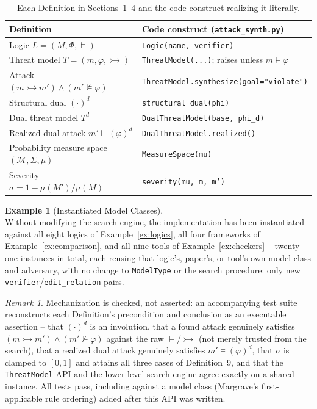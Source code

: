 \documentclass[11pt]{amsart}
\theoremstyle{definition}
\newtheorem{example}{Example}
\theoremstyle{remark}
\newtheorem*{remark}{Remark}
\newcommand{\nsat}{\not\models}
\newcommand{\adv}{\rightarrowtail}   %
\newcommand{\M}{\mathcal{M}}
\begin{document}
\begin{table}[h]
\centering
\small
\renewcommand{\arraystretch}{1.3}
\begin{tabular}{L{4.2cm} L{4.2cm}}
\toprule
\textbf{Definition} & \textbf{Code construct (\texttt{attack\_synth.py})} \\
\midrule
Logic $L = (M, \Phi, \models)$ & \texttt{Logic(name, verifier)} \\
Threat model $T = (m, \varphi, \adv)$ & \texttt{ThreatModel(...)}; raises unless $m \models \varphi$ \\
Attack $(m \adv m') \wedge (m' \nsat \varphi)$ & \texttt{ThreatModel.synthesize(goal="violate")} \\
Structural dual $(\cdot)^{d}$ & \texttt{structural\_dual(phi)} \\
Dual threat model $T^{d}$ & \texttt{DualThreatModel(base, phi\_d)} \\
Realized dual attack $m' \models (\varphi)^{d}$ & \texttt{DualThreatModel.realized()} \\
Probability measure space $(\M, \Sigma, \mu)$ & \texttt{MeasureSpace(mu)} \\
Severity $\sigma = 1 - \mu(M')/\mu(M)$ & \texttt{severity(mu, m, m')} \\
\bottomrule
\end{tabular}
\caption{Each Definition in Sections~1--4 and the code construct realizing it literally.}
\label{tab:conformance}
\end{table}

\begin{example}[Instantiated Model Classes]
\label{ex:instances}
\leavevmode\\
Without modifying the search engine, the implementation has been instantiated against all eight
logics of Example~\ref{ex:logics}, all four frameworks of Example~\ref{ex:comparison}, and all nine
tools of Example~\ref{ex:checkers} -- twenty-one instances in total, each reusing that logic's,
paper's, or tool's own model class and adversary, with no change to \texttt{ModelType} or the search
procedure: only new \texttt{verifier}/\texttt{edit\_relation} pairs.
\end{example}

\begin{remark}
Mechanization is checked, not asserted: an accompanying test suite reconstructs each Definition's
precondition and conclusion as an executable assertion -- that $(\cdot)^{d}$ is an involution, that
a found attack genuinely satisfies $(m \adv m') \wedge (m' \nsat \varphi)$ against the raw
$\models$/$\adv$ (not merely trusted from the search), that a realized dual attack genuinely
satisfies $m' \models (\varphi)^{d}$, that $\sigma$ is clamped to $[0,1]$ and attains all three cases
of Definition~9, and that the \texttt{ThreatModel} API and the lower-level search engine agree
exactly on a shared instance. All tests pass, including against a model class (Margrave's
first-applicable rule ordering) added after this API was written.
\end{remark}
\end{document}
